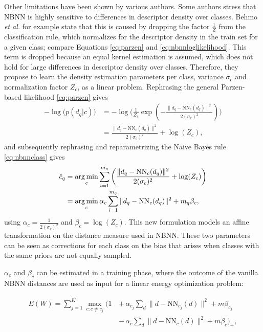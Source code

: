 Other limitations have been shown by various authors.\cite{behmo2010towards, wang2011improved,mccann2011local,tuytelaars2011nbnn,timofte2012iterative} Some authors \cite{behmo2010towards,wang2011improved} stress that NBNN is highly sensitive to differences in descriptor density over classes. Behmo \emph{et al.} for example state that this is caused by dropping the factor $\frac{1}{Z}$ from the classification rule, which normalizes for the descriptor density in the train set for a given class; compare Equations \eqref{eq:parzen} and \eqref{eq:nbnnloglikelihood}. This term is dropped because an equal kernel estimation is assumed, which does not hold for large differences in descriptor density over classes.\cite{behmo2010towards} Therefore, they propose to learn the density estimation parameters per class, variance $\sigma_c$ and normalization factor $Z_c$, as a linear problem. Rephrasing the general Parzen-based likelihood \eqref{eq:parzen} gives
\begin{align}
    - \log\big(p(d_q|c)\big) &= -\log\Bigg(\frac{1}{ Z_c}\exp\left( -\frac{ \|d_q - \text{NN}_c(d_q)\|^2}{2(\sigma_c)^2}\right)\!\Bigg) \\
    &= \frac{ \|d_q - \text{NN}_c(d_q)\|^2}{2(\sigma_c)^2} + \log(Z_c),
\end{align}
and subsequently rephrasing and reparametrizing the Naive Bayes rule \eqref{eq:nbnnclass} gives
\begin{align}
    \hat c_q &= \operatorname*{arg\,min}_c \sum_{i=1}^{m_q} \left(\frac{ \|d_q - \text{NN}_c(d_q)\|^2}{2(\sigma_c)^2} + \log(Z_c)\right)\\
    &= \operatorname*{arg\,min}_c \alpha_c \sum_{i=1}^{m_q} \|d_q - \text{NN}_c(d_q)\|^2 + m_q\beta_c,
\end{align}
using $\alpha_c = \frac{1}{2(\sigma_c)^2}$ and $\beta_c = \log(Z_c)$. This new formulation models an affine transformation on the distance measure used in NBNN. These two parameters can be seen as corrections for each class on the bias that arises when classes with the same priors are not equally sampled.

$\alpha_c$ and $\beta_c$ can be estimated in a training phase, where the outcome of the vanilla NBNN distances are used as input for a linear energy optimization problem:

\begin{align}\begin{split} \label{eq:energy}
    E(W) = \sum_{j=1}^{K} \max_{c:c\neq c_j} \Big(1\,&+\,\alpha_{c_j} \sum_d \|d - \text{NN}_{c_j}(d)\|^2 + m\beta_{c_j}\\
    &-\,\alpha_{c} \sum_d \|d - \text{NN}_{c}(d)\|^2 + m\beta_{c}\Big)_{+},
\end{split}\end{align}

